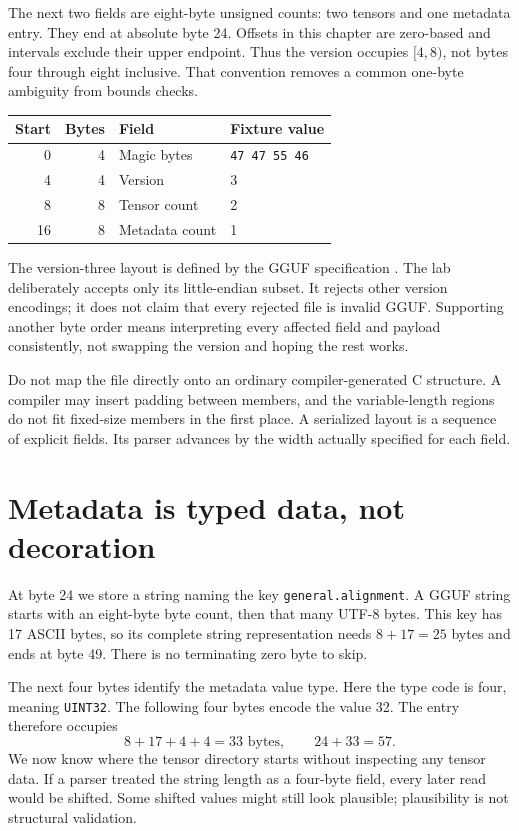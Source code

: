 The next two fields are eight-byte unsigned counts: two tensors and
one metadata entry. They end at absolute byte 24. Offsets in this chapter
are zero-based and intervals exclude their upper endpoint. Thus the
version occupies $[4,8)$, not bytes four through eight inclusive.
That convention removes a common one-byte ambiguity from bounds checks.

\begin{center}
\begin{tabular}{@{}rrll@{}}
\toprule
Start & Bytes & Field & Fixture value\\
\midrule
0 & 4 & Magic bytes & \texttt{47 47 55 46}\\
4 & 4 & Version & 3\\
8 & 8 & Tensor count & 2\\
16 & 8 & Metadata count & 1\\
\bottomrule
\end{tabular}
\end{center}
The version-three layout is defined by the GGUF specification
\cite{ggml2026ggufpinned}. The lab deliberately accepts only its
little-endian subset. It rejects other version encodings; it does not
claim that every rejected file is invalid GGUF. Supporting another
byte order means interpreting every affected field and payload
consistently, not swapping the version and hoping the rest works.

Do not map the file directly onto an ordinary compiler-generated C
structure. A compiler may insert padding between members, and the
variable-length regions do not fit fixed-size members in the first
place. A serialized layout is a sequence of explicit fields. Its parser
advances by the width actually specified for each field.

\section{Metadata is typed data, not decoration}
At byte 24 we store a string naming the key
\texttt{general.alignment}. A GGUF string starts with an eight-byte
byte count, then that many UTF-8 bytes. This key has 17 ASCII bytes,
so its complete string representation needs $8+17=25$ bytes and ends
at byte 49. There is no terminating zero byte to skip.

The next four bytes identify the metadata value type. Here the type
code is four, meaning \texttt{UINT32}. The following four bytes
encode the value 32. The entry therefore occupies
\[
8+17+4+4=33\text{ bytes},
\qquad 24+33=57.
\]
We now know where the tensor directory starts without inspecting any
tensor data. If a parser treated the string length as a four-byte field,
every later read would be shifted. Some shifted values might still look
plausible; plausibility is not structural validation.


